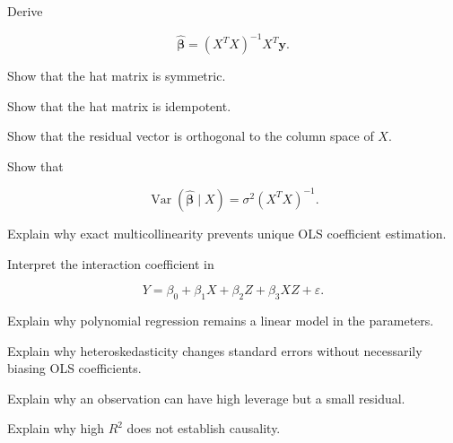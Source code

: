 \begin{exercise}[3]
Derive

\[
\widehat{\boldsymbol{\beta}}
=
(X^TX)^{-1}X^T\mathbf{y}.
\]
\end{exercise}

\begin{exercise}[3]
Show that the hat matrix is symmetric.
\end{exercise}

\begin{exercise}[3]
Show that the hat matrix is idempotent.
\end{exercise}

\begin{exercise}[3]
Show that the residual vector is orthogonal to the column space of \(X\).
\end{exercise}

\begin{exercise}[3]
Show that

\[
\operatorname{Var}
(
\widehat{\boldsymbol{\beta}}\mid X
)
=
\sigma^2(X^TX)^{-1}.
\]
\end{exercise}

\begin{exercise}[3]
Explain why exact multicollinearity prevents unique OLS coefficient
estimation.
\end{exercise}

\begin{exercise}[3]
Interpret the interaction coefficient in

\[
Y
=
\beta_0
+
\beta_1X
+
\beta_2Z
+
\beta_3XZ
+
\varepsilon.
\]
\end{exercise}

\begin{exercise}[3]
Explain why polynomial regression remains a linear model in the
parameters.
\end{exercise}

\begin{exercise}[3]
Explain why heteroskedasticity changes standard errors without
necessarily biasing OLS coefficients.
\end{exercise}

\begin{exercise}[3]
Explain why an observation can have high leverage but a small residual.
\end{exercise}

\begin{exercise}[3]
Explain why high \(R^2\) does not establish causality.
\end{exercise}

